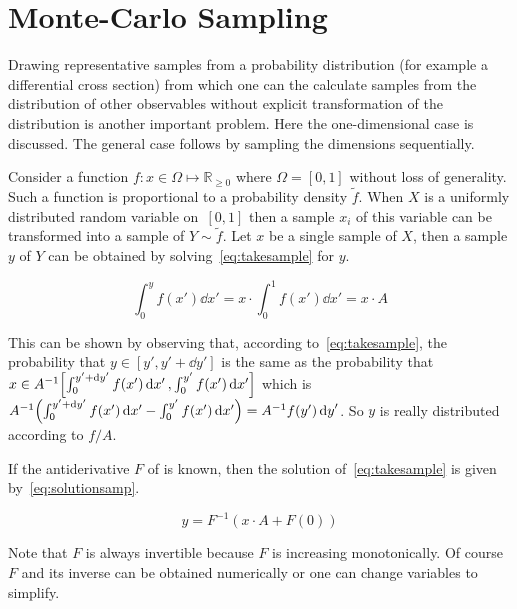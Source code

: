 
\section{Monte-Carlo Sampling}%
\label{sec:mcsamp}

Drawing representative samples from a probability distribution (for
example a differential cross section) from which one can the calculate
samples from the distribution of other observables without explicit
transformation of the distribution is another important problem. Here
the one-dimensional case is discussed. The general case follows by
sampling the dimensions sequentially.

Consider a function \(f\colon x\in\Omega\mapsto\mathbb{R}_{\geq 0}\)
where \(\Omega = [0, 1]\) without loss of generality. Such a function
is proportional to a probability density \(\tilde{f}\). When \(X\) is
a uniformly distributed random variable on~\([0, 1]\) then a sample
\({x_i}\) of this variable can be transformed into a sample of
\(Y\sim\tilde{f}\). Let \(x\) be a single sample of \(X\), then a
sample \(y\) of \(Y\) can be obtained by solving~\eqref{eq:takesample}
for \(y\).

\begin{equation}
  \label{eq:takesample}
  \int_{0}^{y}f(x')\dd{x'} = x\cdot\int_0^1f(x')\dd{x'} = x\cdot A
\end{equation}

This can be shown by observing that, according
to~\eqref{eq:takesample}, the probability that
\(y\in[y', y'+\dd{y}']\) is the same as the probability that
\(x\in A^{-1}\qty[\int_{0}^{y'+\dd{y}'}f(x')\dd{x'},
\int_{0}^{y'}f(x')\dd{x'}]\) which is
\(A^{-1}\qty(\int_{0}^{y'+\dd{y}'}f(x')\dd{x'} -
\int_{0}^{y'}f(x')\dd{x'}) = A^{-1} f(y')\dd{y}'\). So \(y\) is really
distributed according to \(f/A\).

If the antiderivative \(F\) of is known, then the solution
of~\eqref{eq:takesample} is given by~\eqref{eq:solutionsamp}.

\begin{equation}
  \label{eq:solutionsamp}
  y = F^{-1}(x\cdot A + F(0))
\end{equation}

Note that \(F\) is always invertible because \(F\) is
increasing monotonically. Of course \(F\) and its inverse can be
obtained numerically or one can change variables to simplify.

